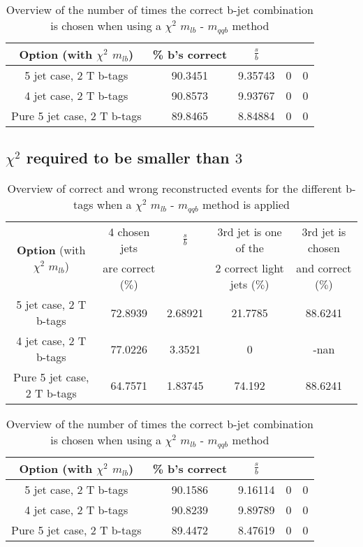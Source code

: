  \begin{table}[!h] 
 \begin{tabular}{c|c|c|c|c} 
 \textbf{Option} (with $\chi^{2}$ $m_{lb}$) & \% b's correct   & $\frac{s}{b}$ &  &  \\ \hline 
 5 jet case,      2 T b-tags              & 90.3451 & 9.35743 & 0 & 0 \\ 
 4 jet case,      2 T b-tags              & 90.8573 & 9.93767 & 0 & 0 \\ 
 Pure 5 jet case, 2 T b-tags              & 89.8465 & 8.84884 & 0 & 0 \\ 
 \end{tabular} 
 \caption{Overview of the number of times the correct b-jet combination is chosen when using a $\chi^{2}$ $m_{lb}$ - $m_{qqb}$ method} 
 \end{table} 
 
 \subsection{$\chi^{2}$ required to be smaller than $3$}
 \begin{table}[!h] 
 \begin{tabular}{c|c|c|c|c} 
\multirow{2}{*}{\textbf{Option} (with $\chi^{2}$ $m_{lb}$)} & 4 chosen jets & $\frac{s}{b}$ & 3rd jet is one of the & 3rd jet is chosen \\ & are correct ($\%$)    & 	             & 2 correct light jets ($\%$) &  and correct ($\%$)	  \\ \hline 
 5 jet case,      2 T b-tags              & 72.8939 & 2.68921 & 21.7785 & 88.6241 \\ 
 4 jet case,      2 T b-tags              & 77.0226 & 3.3521 & 0 & -nan \\ 
 Pure 5 jet case, 2 T b-tags              & 64.7571 & 1.83745 & 74.192 & 88.6241 \\ 
 \end{tabular} 
 \caption{Overview of correct and wrong reconstructed events for the different b-tags when a $\chi^{2}$ $m_{lb}$ - $m_{qqb}$ method is applied} 
 \end{table} 
 
 \begin{table}[!h] 
 \begin{tabular}{c|c|c|c|c} 
 \textbf{Option} (with $\chi^{2}$ $m_{lb}$) & \% b's correct   & $\frac{s}{b}$ &  &  \\ \hline 
 5 jet case,      2 T b-tags              & 90.1586 & 9.16114 & 0 & 0 \\ 
 4 jet case,      2 T b-tags              & 90.8239 & 9.89789 & 0 & 0 \\ 
 Pure 5 jet case, 2 T b-tags              & 89.4472 & 8.47619 & 0 & 0 \\ 
 \end{tabular} 
 \caption{Overview of the number of times the correct b-jet combination is chosen when using a $\chi^{2}$ $m_{lb}$ - $m_{qqb}$ method} 
 \end{table} 
 
